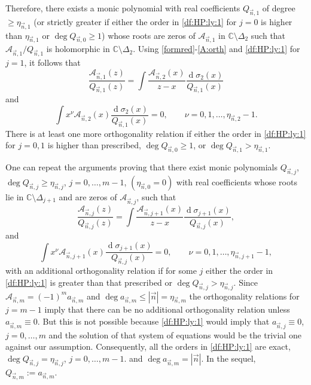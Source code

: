 \documentclass{amsart}
\numberwithin{equation}{section}
\theoremstyle{definition}
\DeclareMathOperator{\D}{d}        %
\newcommand{\CC}{\mathbb{C}}      %
\newcommand{\n}{\vec{n}}          %
\begin{document}
Therefore, there exists a monic polynomial with real coefficients $Q_{\n,1}$ of degree $\geq \eta_{\n,1}$ (or strictly greater if either the order in \eqref{df:HP:ly:1} for $j=0$ is higher than $\eta_{\n,1}$ or $\deg Q_{\n,0} \geq 1$) whose roots are zeros of $\mathcal{A}_{\n,1}$ in $\CC \setminus \Delta_2$ such that $\mathcal{A}_{\n,1}/Q_{\n,1}$ is holomorphic in $\CC \setminus \Delta_2$. Using \eqref{formred}-\eqref{A:orth} and \eqref{df:HP:ly:1} for $j=1$, it follows that
\[
  \frac{\mathcal{A}_{\n,1}(z)}{Q_{\n,1}(z)} = \int \frac{\mathcal{A}_{\n,2}(x)}{z-x}\frac{\D \sigma_2(x)}{Q_{\n,1}(x)}
\]
and
\[
  \int x^\nu \mathcal{A}_{\n,2}(x)\frac{\D \sigma_2(x)}{Q_{\n,1}(x)}=0,\qquad \nu=0,1,\ldots, \eta_{\n,2}-1.
\]
There is at least one more orthogonality relation if either the order in \eqref{df:HP:ly:1} for $j=0,1$ is higher than prescribed,  $\deg Q_{\n,0} \geq 1$, or $\deg Q_{\n,1} > \eta_{\n,1}$.

One can repeat the arguments proving that there exist monic polynomials $Q_{\n,j}$, $\deg Q_{\n,j} \geq \eta_{\n,j}$, $j=0,\ldots,m-1$, $(\eta_{\n,0} = 0)$ with real coefficients whose roots lie in $\CC \setminus \Delta_{j+1}$ and are zeros of $\mathcal{A}_{\n,j}$, such that
\begin{equation}
    \label{formrec}
    \frac{\mathcal{A}_{\n,j}(z)}{Q_{\n,j}(z)} = \int \frac{\mathcal{A}_{\n,j+1}(x)}{z-x}\frac{\D \sigma_{j+1}(x)}{Q_{\n,j}(x)},
\end{equation}
and
\begin{equation}
    \label{ortvar}
    \int x^\nu \mathcal{A}_{\n,j+1}(x) \frac{\D \sigma_{j+1}(x)}{Q_{\n,j}(x)}=0,\qquad \nu=0,1,\ldots, \eta_{\n,j+1}-1,
\end{equation}
with an additional orthogonality relation if for some $j$ either the order in \eqref{df:HP:ly:1} is greater than that prescribed or $\deg Q_{\n,j} > \eta_{\n,j}$. Since $\mathcal{A}_{\n,m} = (-1)^m a_{\n,m}$ and $\deg a_{\n,m} \leq |\n| = \eta_{\n,m}$ the orthogonality relations for $j=m-1$ imply that there can be no additional orthogonality relation unless $a_{\n,m} \equiv 0$. But this is not possible because \eqref{df:HP:ly:1} would imply that $a_{\n,j} \equiv 0$, $j=0,\ldots,m$ and the solution of that system of equations would be the trivial one against our assumption. Consequently, all the orders in \eqref{df:HP:ly:1} are exact, $\deg Q_{\n,j} = \eta_{\n,j}$, $j=0,\ldots,m-1$. and $\deg a_{\n,m} = |\n|$. In the sequel, $Q_{\n,m} := a_{\n,m}$.
\end{document}

